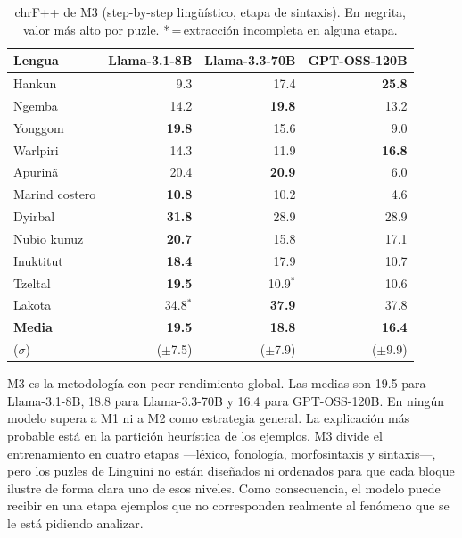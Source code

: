 \begin{table}[H]
	\centering
	\caption{chrF++ de M3 (step-by-step lingüístico, etapa de sintaxis). En negrita, valor más alto por puzle. *\,=\,extracción incompleta en alguna etapa.}
	\label{tab:resultados_m3}
	{\fontsize{10.5pt}{12pt}\selectfont
		\begin{tabular*}{0.95\textwidth}{@{\extracolsep{\fill}} lrrr}
			\toprule
			\textbf{Lengua} & \textbf{Llama-3.1-8B} & \textbf{Llama-3.3-70B} & \textbf{GPT-OSS-120B} \\
			\midrule
			Hankun          & 9.3               & 17.4              & \textbf{25.8} \\
			Ngemba          & 14.2              & \textbf{19.8}     & 13.2          \\
			Yonggom         & \textbf{19.8}     & 15.6              & 9.0           \\
			Warlpiri        & 14.3              & 11.9              & \textbf{16.8} \\
			Apurinã         & 20.4              & \textbf{20.9}     & 6.0           \\
			Marind costero  & \textbf{10.8}     & 10.2              & 4.6           \\
			Dyirbal         & \textbf{31.8}     & 28.9              & 28.9          \\
			Nubio kunuz     & \textbf{20.7}     & 15.8              & 17.1          \\
			Inuktitut       & \textbf{18.4}     & 17.9              & 10.7          \\
			Tzeltal         & \textbf{19.5}     & 10.9$^*$          & 10.6          \\
			Lakota          & 34.8$^*$          & \textbf{37.9}     & 37.8          \\
			\midrule
			\textbf{Media}      & \textbf{19.5} & \textbf{18.8} & \textbf{16.4} \\
			($\sigma$) & ($\pm$7.5) & ($\pm$7.9) & ($\pm$9.9) \\
			\bottomrule
		\end{tabular*}
	}
\end{table}

M3 es la metodología con peor rendimiento global. Las medias son 19.5 para Llama-3.1-8B, 18.8 para Llama-3.3-70B y 16.4 para GPT-OSS-120B. En ningún modelo supera a M1 ni a M2 como estrategia general. La explicación más probable está en la partición heurística de los ejemplos. M3 divide el entrenamiento en cuatro etapas —léxico, fonología, morfosintaxis y sintaxis—, pero los puzles de Linguini no están diseñados ni ordenados para que cada bloque ilustre de forma clara uno de esos niveles. Como consecuencia, el modelo puede recibir en una etapa ejemplos que no corresponden realmente al fenómeno que se le está pidiendo analizar.

